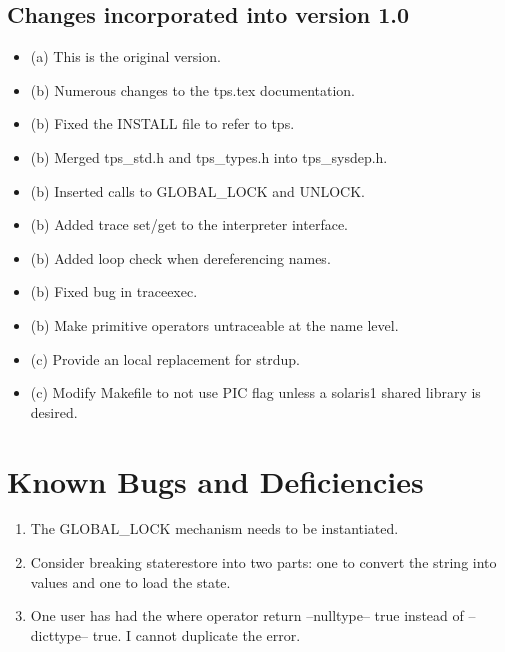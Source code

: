 \subsection{Changes incorporated into version 1.0}
\begin{itemize}
\item (a) This is the original version.
\item (b) Numerous changes to the tps.tex documentation.
\item (b) Fixed the INSTALL file to refer to tps.
\item (b) Merged tps\_std.h and tps\_types.h into tps\_sysdep.h.
\item (b) Inserted calls to GLOBAL\_LOCK and UNLOCK.
\item (b) Added trace set/get to the interpreter interface.
\item (b) Added loop check when dereferencing names.
\item (b) Fixed bug in traceexec.
\item (b) Make primitive operators untraceable at the name level.
\item (c) Provide an local replacement for strdup.
\item (c) Modify Makefile to not use PIC flag unless
a solaris1 shared library is desired.
\end{itemize}

\newpage
\section{Known Bugs and Deficiencies}
\begin{enumerate}
\item The GLOBAL\_LOCK mechanism needs to be instantiated.
\item Consider breaking staterestore into two parts:
one to convert the string into values and one to
load the state.
\item One user has had the where operator return --nulltype-- true
instead of --dicttype-- true.  I cannot duplicate the error.
\end{enumerate}


